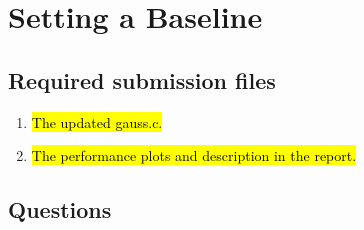 \section{Setting a Baseline}
\subsection{Required submission files}
\begin{enumerate}
	\item \hl{The updated gauss.c.}

	\item \hl{The performance plots and description in the report.}

\end{enumerate}

\subsection{Questions}
